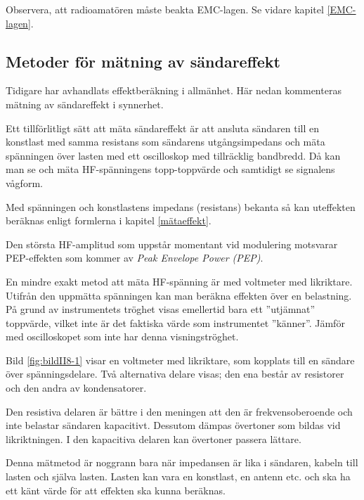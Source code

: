 Observera, att radioamatören måste beakta EMC-lagen.
Se vidare kapitel \ref{EMC-lagen}.

\subsection{Metoder för mätning av sändareffekt}

Tidigare har avhandlats effektberäkning i allmänhet.
Här nedan kommenteras mätning av sändareffekt i synnerhet.

Ett tillförlitligt sätt att mäta sändareffekt är att ansluta sändaren
till en konstlast med samma resistans som sändarens utgångsimpedans
och mäta spänningen över lasten med ett oscilloskop med tillräcklig bandbredd.
Då kan man se och mäta HF-spänningens topp-toppvärde och samtidigt se
signalens vågform.

Med spänningen och konstlastens impedans (resistans) bekanta så kan
uteffekten beräknas enligt formlerna i kapitel \ref{mätaeffekt}.

Den största HF-amplitud som uppstår momentant vid modulering motsvarar
PEP-effekten som kommer av \emph{Peak Envelope Power (PEP)}.

En mindre exakt metod att mäta HF-spänning är med voltmeter med likriktare.
Utifrån den uppmätta spänningen kan man beräkna effekten över en belastning.
På grund av instrumentets tröghet visas emellertid bara ett ''utjämnat''
toppvärde, vilket inte är det faktiska värde som instrumentet ''känner''.
Jämför med oscilloskopet som inte har denna visningströghet.


Bild \ref{fig:bildII8-1} visar en voltmeter med likriktare, som kopplats till
en sändare över spänningsdelare.
Två alternativa delare visas; den ena består av resistorer och den andra av
kondensatorer.

Den resistiva delaren är bättre i den meningen att den är frekvensoberoende och
inte belastar sändaren kapacitivt.
Dessutom dämpas övertoner som bildas vid likriktningen.
I den kapacitiva delaren kan övertoner passera lättare.

Denna mätmetod är noggrann bara när impedansen är lika i sändaren,
kabeln till lasten och själva lasten.
Lasten kan vara en konstlast, en antenn etc. och ska ha ett känt värde för att
effekten ska kunna beräknas.

